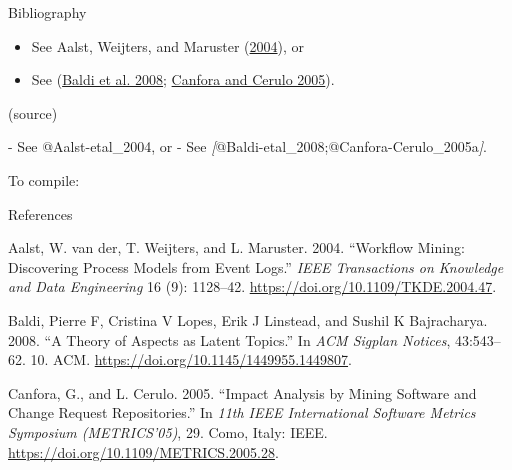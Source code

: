 \documentclass[
  10pt,
  ignorenonframetext,
  serif,onlymath]{beamer}
\newenvironment{Shaded}{}{}
\newcommand{\AttributeTok}[1]{\textcolor[rgb]{0.49,0.56,0.16}{#1}}
\newcommand{\CommentTok}[1]{\textcolor[rgb]{0.38,0.63,0.69}{\textit{#1}}}
\newcommand{\DataTypeTok}[1]{\textcolor[rgb]{0.56,0.13,0.00}{#1}}
\newcommand{\ExtensionTok}[1]{#1}
\newcommand{\NormalTok}[1]{#1}
\newcommand{\OtherTok}[1]{\textcolor[rgb]{0.00,0.44,0.13}{#1}}
\newcommand{\SpecialStringTok}[1]{\textcolor[rgb]{0.73,0.40,0.53}{#1}}
\providecommand{\tightlist}{%
  \setlength{\itemsep}{0pt}\setlength{\parskip}{0pt}}
\newlength{\cslhangindent}
\newlength{\cslentryspacingunit} %
\newenvironment{CSLReferences}[2] %
 {%
  \setlength{\parindent}{0pt}
  \ifodd #1
  \let\oldpar\par
  \def\par{\hangindent=\cslhangindent\oldpar}
  \fi
  \setlength{\parskip}{#2\cslentryspacingunit}
 }%
 {}
\begin{document}
\begin{frame}[fragile]{Bibliography}
\protect\hypertarget{bibliography}{}
\begin{itemize}
\tightlist
\item
  See Aalst, Weijters, and Maruster
  (\protect\hyperlink{ref-Aalst-etal_2004}{2004}), or
\item
  See (\protect\hyperlink{ref-Baldi-etal_2008}{Baldi et al. 2008};
  \protect\hyperlink{ref-Canfora-Cerulo_2005a}{Canfora and Cerulo
  2005}).
\end{itemize}

(source)

\begin{Shaded}
\begin{Highlighting}[]
\SpecialStringTok{{-} }\NormalTok{See @Aalst{-}etal\_2004, or}
\SpecialStringTok{{-} }\NormalTok{See }\CommentTok{[}\OtherTok{@Baldi{-}etal\_2008;@Canfora{-}Cerulo\_2005a}\CommentTok{]}\NormalTok{.}
\end{Highlighting}
\end{Shaded}

To compile:

\begin{Shaded}
\end{Shaded}
\end{frame}

\begin{frame}[allowframebreaks]{References}
\protect\hypertarget{references}{}
\hypertarget{refs}{}
\begin{CSLReferences}{1}{0}
\leavevmode{}%
Aalst, W. van der, T. Weijters, and L. Maruster. 2004. {``Workflow
Mining: Discovering Process Models from Event Logs.''} \emph{IEEE
Transactions on Knowledge and Data Engineering} 16 (9): 1128--42.
\url{https://doi.org/10.1109/TKDE.2004.47}.

\leavevmode{}%
Baldi, Pierre F, Cristina V Lopes, Erik J Linstead, and Sushil K
Bajracharya. 2008. {``A Theory of Aspects as Latent Topics.''} In
\emph{ACM Sigplan Notices}, 43:543--62. 10. ACM.
\url{https://doi.org/10.1145/1449955.1449807}.

\leavevmode{}%
Canfora, G., and L. Cerulo. 2005. {``Impact Analysis by Mining Software
and Change Request Repositories.''} In \emph{11th IEEE International
Software Metrics Symposium (METRICS'05)}, 29. Como, Italy: IEEE.
\url{https://doi.org/10.1109/METRICS.2005.28}.

\end{CSLReferences}
\end{frame}
\end{document}
